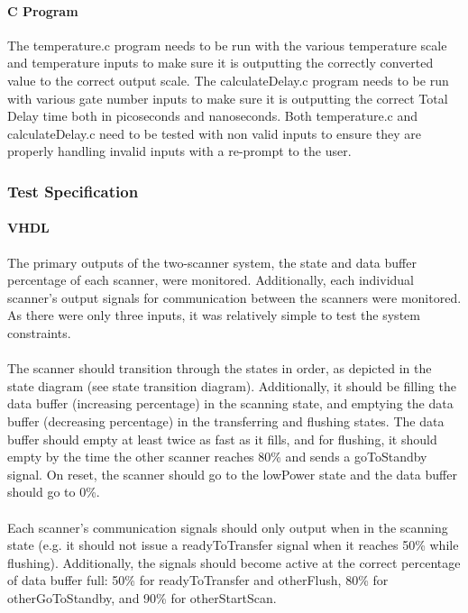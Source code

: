 \documentclass{article}
\begin{document}
  \paragraph{C Program} The temperature.c program needs to be run with the various temperature scale and temperature inputs to make sure it is outputting the correctly converted value to the correct output scale. The calculateDelay.c program needs to be run with various gate number inputs to make sure it is outputting the correct Total Delay time both in picoseconds and nanoseconds. Both temperature.c and calculateDelay.c need to be tested with non valid inputs to ensure they are properly handling invalid inputs with a re-prompt to the user.


  \subsubsection{Test Specification}
  \paragraph{VHDL} The primary outputs of the two-scanner system, the state and data buffer percentage of each scanner, were monitored. Additionally, each individual scanner’s output signals for communication between the scanners were monitored. As there were only three inputs, it was relatively simple to test the system constraints.

  \paragraph{} The scanner should transition through the states in order, as depicted in the state diagram (see state transition diagram). Additionally, it should be filling the data buffer (increasing percentage) in the scanning state, and emptying the data buffer (decreasing percentage) in the transferring and flushing states. The data buffer should empty at least twice as fast as it fills, and for flushing, it should empty by the time the other scanner reaches 80\% and sends a goToStandby signal. On reset, the scanner should go to the lowPower state and the data buffer should go to 0\%.

  \paragraph{} Each scanner’s communication signals should only output when in the scanning state (e.g. it should not issue a readyToTransfer signal when it reaches 50\% while flushing). Additionally, the signals should become active at the correct percentage of data buffer full: 50\% for readyToTransfer and otherFlush, 80\% for otherGoToStandby, and 90\% for otherStartScan.
\end{document}
